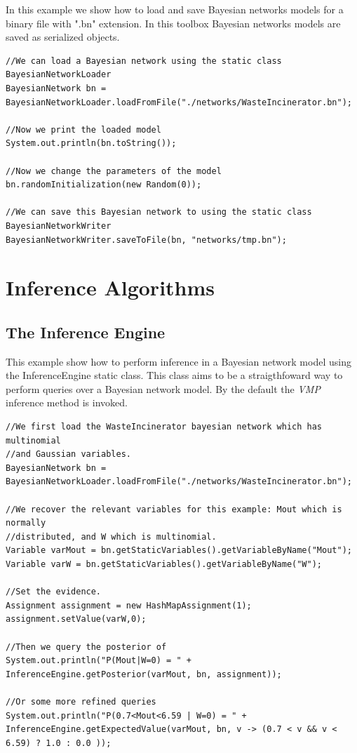 In this example we show how to load and save Bayesian networks models for a binary file with ".bn" extension. In this toolbox Bayesian networks models are saved as serialized objects.

\begin{lstlisting}
//We can load a Bayesian network using the static class BayesianNetworkLoader
BayesianNetwork bn = BayesianNetworkLoader.loadFromFile("./networks/WasteIncinerator.bn");

//Now we print the loaded model
System.out.println(bn.toString());

//Now we change the parameters of the model
bn.randomInitialization(new Random(0));

//We can save this Bayesian network to using the static class BayesianNetworkWriter
BayesianNetworkWriter.saveToFile(bn, "networks/tmp.bn");
\end{lstlisting}


\section{Inference Algorithms}

\subsection{The Inference Engine}
This example show how to perform inference in a Bayesian network model using the InferenceEngine static class. This class aims to be a straigthfoward way to perform queries over a Bayesian network model. By the default the \textit{VMP} inference method is invoked.

\begin{lstlisting}
//We first load the WasteIncinerator bayesian network which has multinomial 
//and Gaussian variables.
BayesianNetwork bn = BayesianNetworkLoader.loadFromFile("./networks/WasteIncinerator.bn");

//We recover the relevant variables for this example: Mout which is normally 
//distributed, and W which is multinomial.
Variable varMout = bn.getStaticVariables().getVariableByName("Mout");
Variable varW = bn.getStaticVariables().getVariableByName("W");

//Set the evidence.
Assignment assignment = new HashMapAssignment(1);
assignment.setValue(varW,0);

//Then we query the posterior of
System.out.println("P(Mout|W=0) = " + InferenceEngine.getPosterior(varMout, bn, assignment));

//Or some more refined queries
System.out.println("P(0.7<Mout<6.59 | W=0) = " + InferenceEngine.getExpectedValue(varMout, bn, v -> (0.7 < v && v < 6.59) ? 1.0 : 0.0 ));
\end{lstlisting}

